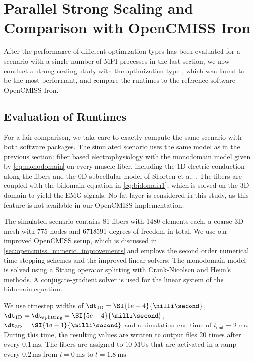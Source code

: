 


\section{Parallel Strong Scaling and Comparison with OpenCMISS Iron}

After the performance of different optimization types has been evaluated for a scenario with a single number of MPI processes in the last section, we now conduct a strong scaling study with the optimization type , which was found to be the most performant, and compare the runtimes to the reference software OpenCMISS Iron.

\subsection{Evaluation of Runtimes}\label{sec:strong_scaling_runtimes_opencmiss_opendihu}
For a fair comparison, we take care to exactly compute the same scenario with both software packages. The simulated scenario uses the same model as in the previous section: fiber based electrophysiology with the monodomain model given by \cref{eq:monodomain} on every muscle fiber, including the 1D electric conduction along the fibers and the 0D subcellular model of Shorten et al. \cite{Shorten2007}. The fibers are coupled with the bidomain equation in \cref{eq:bidomain1}, which is solved on the 3D domain to yield the EMG signals. No fat layer is considered in this study, as this feature is not available in our OpenCMISS implementation.

The simulated scenario contains 81 fibers with \num{1480} elements each, a coarse 3D mesh with \num{775} nodes and \num{6718591} degrees of freedom in total. 
We use our improved OpenCMISS setup, which is discussed in \cref{sec:opencmiss_numeric_improvements} and employs the second order numerical time stepping schemes and the improved linear solvers:
The monodomain model is solved using a Strang operator splitting with Crank-Nicolson and Heun's methods. A conjugate-gradient solver is used for the linear system of the bidomain equation.

We use timestep widths of $\dt_\text{0D}=\SI{1e-4}{\milli\second}$, $\dt_\text{1D}=\dt_\text{splitting}=\SI{5e-4}{\milli\second}$, $\dt_\text{3D}=\SI{1e-1}{\milli\second}$ and a simulation end time of $t_\text{end}=\SI{2}{\milli\second}$. 
During this time, the resulting values are written to output files 20 times after every $\SI{0.1}{\milli\second}$. 
The fibers are assigned to 10 MUs that are activated in a ramp every $\SI{0.2}{\milli\second}$ from $t=\SI{0}{\milli\second}$ to $t=\SI{1.8}{\milli\second}$.


